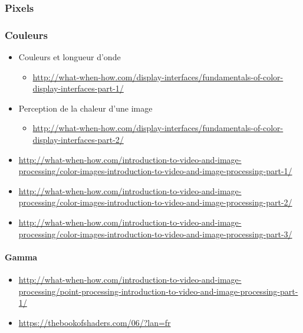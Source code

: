 \documentclass[
  french,
]{book}
\providecommand{\tightlist}{%
  \setlength{\itemsep}{0pt}\setlength{\parskip}{0pt}}
\begin{document}
\hypertarget{pixels}{%
\subsubsection{Pixels}\label{pixels}}

\hypertarget{couleurs}{%
\subsubsection{Couleurs}\label{couleurs}}

\begin{itemize}
\tightlist
\item
  Couleurs et longueur d'onde

  \begin{itemize}
  \tightlist
  \item
    \url{http://what-when-how.com/display-interfaces/fundamentals-of-color-display-interfaces-part-1/}
  \end{itemize}
\item
  Perception de la chaleur d'une image

  \begin{itemize}
  \tightlist
  \item
    \url{http://what-when-how.com/display-interfaces/fundamentals-of-color-display-interfaces-part-2/}
  \end{itemize}
\item
  \url{http://what-when-how.com/introduction-to-video-and-image-processing/color-images-introduction-to-video-and-image-processing-part-1/}
\item
  \url{http://what-when-how.com/introduction-to-video-and-image-processing/color-images-introduction-to-video-and-image-processing-part-2/}
\item
  \url{http://what-when-how.com/introduction-to-video-and-image-processing/color-images-introduction-to-video-and-image-processing-part-3/}
\end{itemize}

\hypertarget{gamma}{%
\paragraph{Gamma}\label{gamma}}

\begin{itemize}
\item
  \url{http://what-when-how.com/introduction-to-video-and-image-processing/point-processing-introduction-to-video-and-image-processing-part-1/}
\item
  \url{https://thebookofshaders.com/06/?lan=fr}
\end{itemize}
\end{document}
